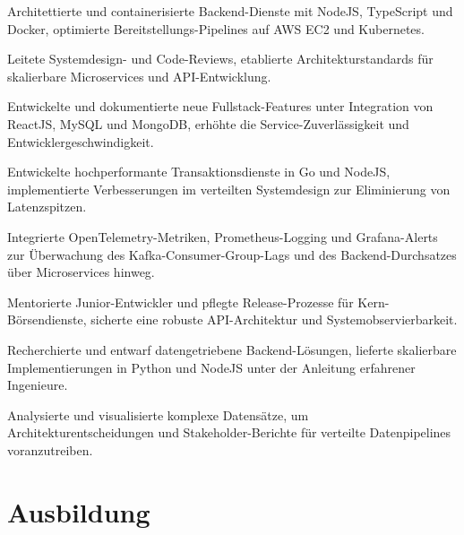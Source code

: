 \documentclass[10pt,a4paper]{resume}
\begin{document}
\bullets
  \item Architettierte und containerisierte Backend-Dienste mit NodeJS, TypeScript und Docker, optimierte Bereitstellungs-Pipelines auf AWS EC2 und Kubernetes.
  \item Leitete Systemdesign- und Code-Reviews, etablierte Architekturstandards für skalierbare Microservices und API-Entwicklung.
  \item Entwickelte und dokumentierte neue Fullstack-Features unter Integration von ReactJS, MySQL und MongoDB, erhöhte die Service-Zuverlässigkeit und Entwicklergeschwindigkeit.
\bulletsend
\vspace{1.5pt}
\bullets
  \item Entwickelte hochperformante Transaktionsdienste in Go und NodeJS, implementierte Verbesserungen im verteilten Systemdesign zur Eliminierung von Latenzspitzen.
  \item Integrierte OpenTelemetry-Metriken, Prometheus-Logging und Grafana-Alerts zur Überwachung des Kafka-Consumer-Group-Lags und des Backend-Durchsatzes über Microservices hinweg.
  \item Mentorierte Junior-Entwickler und pflegte Release-Prozesse für Kern-Börsendienste, sicherte eine robuste API-Architektur und Systemobservierbarkeit.
\bulletsend
\vspace{1.5pt}
\bullets
  \item Recherchierte und entwarf datengetriebene Backend-Lösungen, lieferte skalierbare Implementierungen in Python und NodeJS unter der Anleitung erfahrener Ingenieure.
  \item Analysierte und visualisierte komplexe Datensätze, um Architekturentscheidungen und Stakeholder-Berichte für verteilte Datenpipelines voranzutreiben.
\bulletsend
\vspace{1.5pt}

\section{Ausbildung}

\vspace{2pt}
\end{document}
